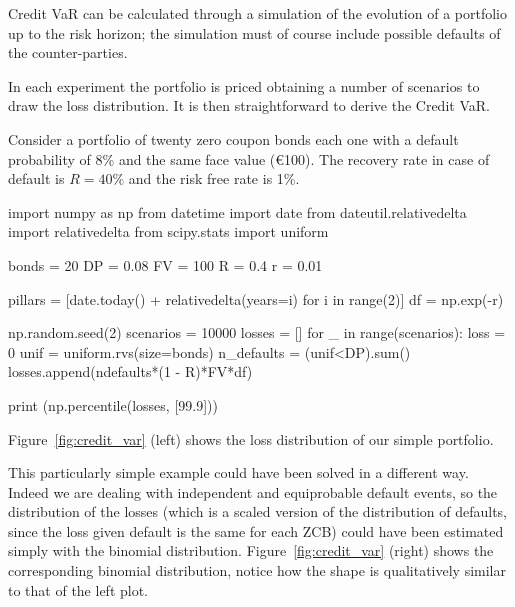 Credit VaR can be calculated through a simulation of the evolution of a portfolio up to the risk horizon; the simulation must of course include possible defaults of the counter-parties. 

In each experiment the portfolio is priced obtaining a number of scenarios to draw the loss distribution. It is then straightforward to derive the Credit VaR.

Consider a portfolio of twenty zero coupon bonds each one with a default probability of 8\% and the same face value (\euro{100}). The recovery rate in case of default is $R=40\%$ and the risk free rate is 1\%.

\begin{ipython}
import numpy as np
from datetime import date
from dateutil.relativedelta import relativedelta
from scipy.stats import uniform

bonds = 20
DP = 0.08
FV = 100
R = 0.4
r = 0.01

pillars = [date.today() + relativedelta(years=i) for i in range(2)]
df = np.exp(-r)

np.random.seed(2)
scenarios = 10000
losses = []
for _ in range(scenarios):
    loss = 0
    unif = uniform.rvs(size=bonds)
    n_defaults = (unif<DP).sum()
    losses.append(ndefaults*(1 - R)*FV*df)

print (np.percentile(losses, [99.9]))
\end{ipython}
\begin{ioutput}
[356.41794015]
\end{ioutput}
\noindent
Figure~\ref{fig:credit_var} (left) shows the loss distribution of our simple portfolio.

This particularly simple example could have been solved in a different way. Indeed we are dealing with independent and equiprobable default events, so the distribution of the losses (which is a scaled version of the distribution of defaults, since the loss given default is the same for each ZCB) could have been estimated simply with the binomial distribution. Figure~\ref{fig:credit_var} (right) shows the corresponding binomial distribution, notice how the shape is qualitatively similar to that of the left plot.


